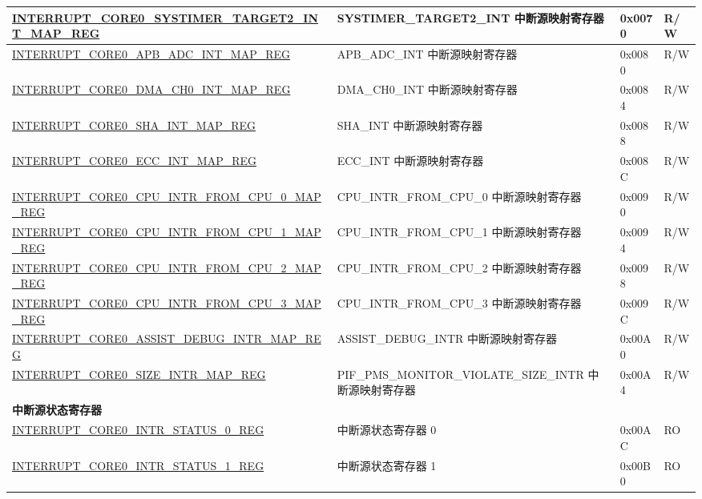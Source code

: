 \begin{longtable}{ | p{10cm} | m{10cm} | m{1.3cm} | m{1.0cm} | }
\hyperref[regdesc:INTERRUPTCORE0SYSTIMERTARGET2INTMAPREG]{INTERRUPT\_CORE0\_SYSTIMER\_TARGET2\_INT\_MAP\_REG} & SYSTIMER\_TARGET2\_INT 中断源映射寄存器 & 0x0070 & R/W \\ \hline
\hyperref[regdesc:INTERRUPTCORE0APBADCINTMAPREG]{INTERRUPT\_CORE0\_APB\_ADC\_INT\_MAP\_REG} & APB\_ADC\_INT 中断源映射寄存器 & 0x0080 & R/W \\ \hline
\hyperref[regdesc:INTERRUPTCORE0DMACH0INTMAPREG]{INTERRUPT\_CORE0\_DMA\_CH0\_INT\_MAP\_REG} & DMA\_CH0\_INT 中断源映射寄存器 & 0x0084 & R/W \\ \hline
\hyperref[regdesc:INTERRUPTCORE0SHAINTMAPREG]{INTERRUPT\_CORE0\_SHA\_INT\_MAP\_REG} & SHA\_INT 中断源映射寄存器 & 0x0088 & R/W \\ \hline
\hyperref[regdesc:INTERRUPTCORE0ECCINTMAPREG]{INTERRUPT\_CORE0\_ECC\_INT\_MAP\_REG} & ECC\_INT 中断源映射寄存器 & 0x008C & R/W \\ \hline
\hyperref[regdesc:INTERRUPTCORE0CPUINTRFROMCPU0MAPREG]{INTERRUPT\_CORE0\_CPU\_INTR\_FROM\_CPU\_0\_MAP\_REG} & CPU\_INTR\_FROM\_CPU\_0 中断源映射寄存器 & 0x0090 & R/W \\ \hline
\hyperref[regdesc:INTERRUPTCORE0CPUINTRFROMCPU1MAPREG]{INTERRUPT\_CORE0\_CPU\_INTR\_FROM\_CPU\_1\_MAP\_REG} & CPU\_INTR\_FROM\_CPU\_1 中断源映射寄存器 & 0x0094 & R/W \\ \hline
\hyperref[regdesc:INTERRUPTCORE0CPUINTRFROMCPU2MAPREG]{INTERRUPT\_CORE0\_CPU\_INTR\_FROM\_CPU\_2\_MAP\_REG} & CPU\_INTR\_FROM\_CPU\_2 中断源映射寄存器 & 0x0098 & R/W \\ \hline
\hyperref[regdesc:INTERRUPTCORE0CPUINTRFROMCPU3MAPREG]{INTERRUPT\_CORE0\_CPU\_INTR\_FROM\_CPU\_3\_MAP\_REG} & CPU\_INTR\_FROM\_CPU\_3 中断源映射寄存器 & 0x009C & R/W \\ \hline
\hyperref[regdesc:INTERRUPTCORE0ASSISTDEBUGINTRMAPREG]{INTERRUPT\_CORE0\_ASSIST\_DEBUG\_INTR\_MAP\_REG} & ASSIST\_DEBUG\_INTR 中断源映射寄存器 & 0x00A0 & R/W \\ \hline
\hyperref[regdesc:INTERRUPTCORE0PIFPMSMONITORVIOLATESIZEINTRMAPREG]{INTERRUPT\_CORE0\_SIZE\_INTR\_MAP\_REG} & PIF\_PMS\_MONITOR\_VIOLATE\_SIZE\_INTR 中断源映射寄存器 & 0x00A4 & R/W \\ \hline
\multicolumn{4}{|l|}{\textbf{中断源状态寄存器}} \\ \hline
\hyperref[regdesc:INTERRUPTCORE0INTRSTATUS0REG]{INTERRUPT\_CORE0\_INTR\_STATUS\_0\_REG} & 中断源状态寄存器 0 & 0x00AC & RO \\ \hline
\hyperref[regdesc:INTERRUPTCORE0INTRSTATUS1REG]{INTERRUPT\_CORE0\_INTR\_STATUS\_1\_REG} & 中断源状态寄存器 1 & 0x00B0 & RO \\ \hline

\end{longtable}

